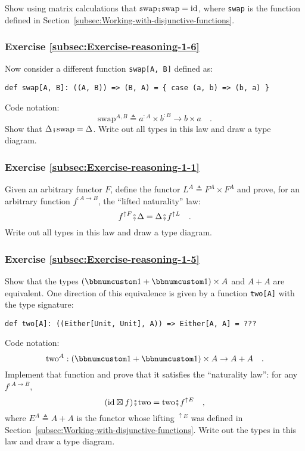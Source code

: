 Show using matrix calculations that $\text{swap}\bef\text{swap}=\text{id}$,
where \lstinline!swap! is the function defined in Section~\ref{subsec:Working-with-disjunctive-functions}.

\subsubsection{Exercise \label{subsec:Exercise-reasoning-1-6}\ref{subsec:Exercise-reasoning-1-6}}

Now consider a different function \lstinline!swap[A, B]! defined
as:
\begin{lstlisting}
def swap[A, B]: ((A, B)) => (B, A) = { case (a, b) => (b, a) }
\end{lstlisting}
Code notation:
\[
\text{swap}^{A,B}\triangleq a^{:A}\times b^{:B}\rightarrow b\times a\quad.
\]
Show that $\Delta\bef\text{swap}=\Delta$. Write out all types in
this law and draw a type diagram.

\subsubsection{Exercise \label{subsec:Exercise-reasoning-1-1}\ref{subsec:Exercise-reasoning-1-1}}

Given an arbitrary functor $F$, define the functor $L^{A}\triangleq F^{A}\times F^{A}$
and prove, for an arbitrary function $f^{:A\rightarrow B}$, the \textsf{``}lifted
naturality\textsf{''} law:
\[
f^{\uparrow F}\bef\Delta=\Delta\bef f^{\uparrow L}\quad.
\]
Write out all types in this law and draw a type diagram.

\subsubsection{Exercise \label{subsec:Exercise-reasoning-1-5}\ref{subsec:Exercise-reasoning-1-5}}

Show that the types $(\bbnum 1+\bbnum 1)\times A$ and $A+A$ are
equivalent. One direction of this equivalence is given by a function
\lstinline!two[A]! with the type signature:
\begin{lstlisting}
def two[A]: ((Either[Unit, Unit], A)) => Either[A, A] = ???
\end{lstlisting}
Code notation:
\[
\text{two}^{A}:(\bbnum 1+\bbnum 1)\times A\rightarrow A+A\quad.
\]
Implement that function and prove that it satisfies the \textsf{``}naturality
law\textsf{''}: for any $f^{:A\rightarrow B}$,
\[
(\text{id}\boxtimes f)\bef\text{two}=\text{two}\bef f^{\uparrow E}\quad,
\]
where $E^{A}\triangleq A+A$ is the functor whose lifting $^{\uparrow E}$
was defined in Section~\ref{subsec:Working-with-disjunctive-functions}.
Write out the types in this law and draw a type diagram. 

